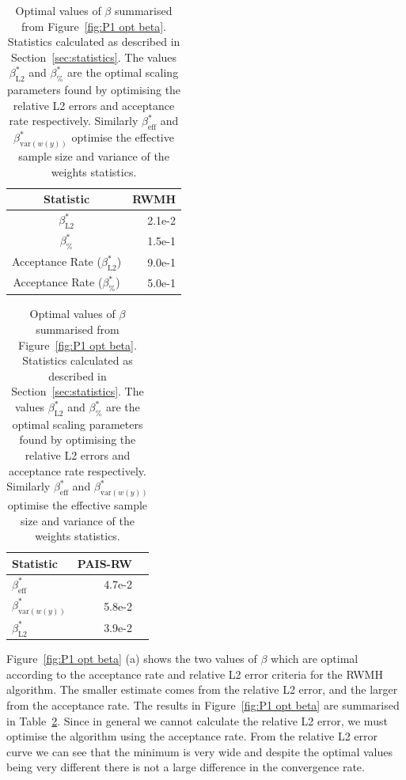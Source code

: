 \documentclass[final]{siamltex}
\begin{document}
\begin{table}[!htb]
    \begin{minipage}{.5\linewidth}
      \centering
        \begin{tabular}{|c|r|}
	\hline
	Statistic											& RWMH \\ \hline
	$\beta_{\text{L2}}^*$								& 2.1e-2 \\
	$\beta_{\%}^*$									& 1.5e-1 \\
	Acceptance Rate ($\beta_{\text{L2}}^*$)				& 9.0e-1 \\
	Acceptance Rate ($\beta_{\%}^*$)					& 5.0e-1 \\
	\hline
	\end{tabular}
    \end{minipage}%
    \begin{minipage}{.5\linewidth}
      \centering
        \begin{tabular}{|l|r|r|}
	\hline
	Statistic							& PAIS-RW \\ \hline
	$\beta_{\text{eff}}^*$				& 4.7e-2 \\
	$\beta_{\text{var}(w(y))}^*$		& 5.8e-2 \\
	$\beta_{\text{L2}}^*$				& 3.9e-2 \\
	\hline
	\end{tabular}
    \end{minipage}
	\vspace{1mm}
	\caption{Optimal values of $\beta$ summarised from Figure~\ref{fig:P1 opt beta}. Statistics calculated as described in Section~\ref{sec:statistics}. The values $\beta^*_{\text{L2}}$ and $\beta^*_{\%}$ are the optimal scaling parameters found by optimising the relative L2 errors and acceptance rate respectively. Similarly $\beta_{\text{eff}}^*$ and $\beta_{\text{var}(w(y))}^*$ optimise the effective sample size and variance of the weights statistics.}
	\label{table:prob1 opt beta}
\end{table}

Figure~\ref{fig:P1 opt beta} (a) shows the two values of $\beta$ which are optimal according to the acceptance rate and relative L2 error criteria for the RWMH algorithm. The smaller estimate comes from the relative L2 error, and the larger from the acceptance rate. The results in Figure~\ref{fig:P1 opt beta} are summarised in Table~\ref{table:prob1 opt beta}. Since in general we cannot calculate the relative L2 error, we must optimise the algorithm using the acceptance rate. From the relative L2 error curve we can see that the minimum is very wide and despite the optimal values being very different there is not a large difference in the convergence rate.
\end{document}
